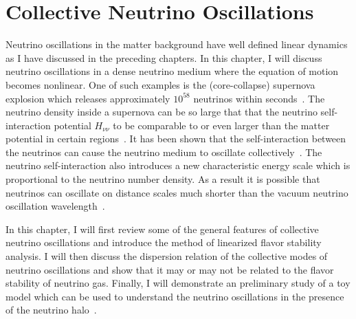 
\chapter{\label{chap:collective}Collective Neutrino Oscillations}

Neutrino oscillations in the matter background have well defined linear dynamics as I  have discussed in the preceding chapters. In this chapter, I will discuss neutrino oscillations in a dense neutrino medium where the equation of motion becomes nonlinear.
One of such examples is the (core-collapse) supernova explosion which releases approximately $10^{58}$ neutrinos within seconds~\cite{Bahcall1987}. The neutrino density inside a supernova can be so large that that the neutrino self-interaction potential $H_{\nu\nu}$ to be comparable to or even larger than the matter potential in certain regions~\cite{Flowers1976a}. It has been shown that the self-interaction between the neutrinos can cause the neutrino medium to oscillate collectively~\cite{Duan2010, Duan2006}. The neutrino self-interaction also introduces a new characteristic energy scale which is proportional to the neutrino number density. As a result it is possible that neutrinos can oscillate on distance scales much shorter than the vacuum neutrino oscillation wavelength~\cite{Sawyer2016,Chakraborty2016}.

In this chapter, I will first review some of the general features of collective neutrino oscillations and introduce the method of linearized flavor stability analysis. I will then discuss the dispersion relation of the collective modes of neutrino oscillations and show that it may or may not be related to the flavor stability of neutrino gas. Finally, I will demonstrate an preliminary study of a toy model which can be used to understand the neutrino oscillations in the presence of the neutrino halo~\cite{Sarikas2012a,Cherry2012}.


